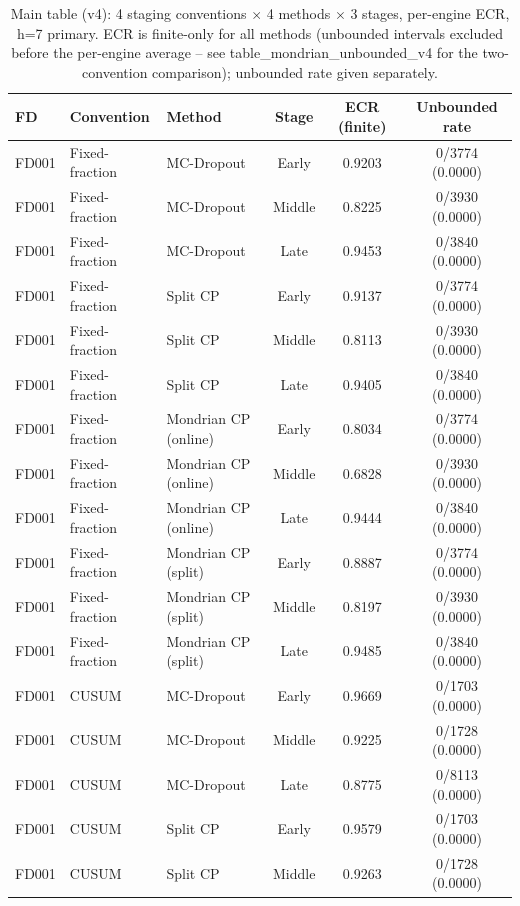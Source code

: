 \begin{table}[t]
\caption{Main table (v4): 4 staging conventions $\times$ 4 methods $\times$ 3 stages, per-engine ECR, h=7 primary. ECR is finite-only for all methods (unbounded intervals excluded before the per-engine average -- see table\_mondrian\_unbounded\_v4 for the two-convention comparison); unbounded rate given separately.}
\label{tab:main-v4}
\centering
\small
\begin{tabular}{lllccc}
\toprule
FD & Convention & Method & Stage & ECR (finite) & Unbounded rate \\
\midrule
FD001 & Fixed-fraction & MC-Dropout & Early & 0.9203 & 0/3774 (0.0000) \\
FD001 & Fixed-fraction & MC-Dropout & Middle & 0.8225 & 0/3930 (0.0000) \\
FD001 & Fixed-fraction & MC-Dropout & Late & 0.9453 & 0/3840 (0.0000) \\
FD001 & Fixed-fraction & Split CP & Early & 0.9137 & 0/3774 (0.0000) \\
FD001 & Fixed-fraction & Split CP & Middle & 0.8113 & 0/3930 (0.0000) \\
FD001 & Fixed-fraction & Split CP & Late & 0.9405 & 0/3840 (0.0000) \\
FD001 & Fixed-fraction & Mondrian CP (online) & Early & 0.8034 & 0/3774 (0.0000) \\
FD001 & Fixed-fraction & Mondrian CP (online) & Middle & 0.6828 & 0/3930 (0.0000) \\
FD001 & Fixed-fraction & Mondrian CP (online) & Late & 0.9444 & 0/3840 (0.0000) \\
FD001 & Fixed-fraction & Mondrian CP (split) & Early & 0.8887 & 0/3774 (0.0000) \\
FD001 & Fixed-fraction & Mondrian CP (split) & Middle & 0.8197 & 0/3930 (0.0000) \\
FD001 & Fixed-fraction & Mondrian CP (split) & Late & 0.9485 & 0/3840 (0.0000) \\
FD001 & CUSUM & MC-Dropout & Early & 0.9669 & 0/1703 (0.0000) \\
FD001 & CUSUM & MC-Dropout & Middle & 0.9225 & 0/1728 (0.0000) \\
FD001 & CUSUM & MC-Dropout & Late & 0.8775 & 0/8113 (0.0000) \\
FD001 & CUSUM & Split CP & Early & 0.9579 & 0/1703 (0.0000) \\
FD001 & CUSUM & Split CP & Middle & 0.9263 & 0/1728 (0.0000) \\

\end{tabular}
\end{table}
